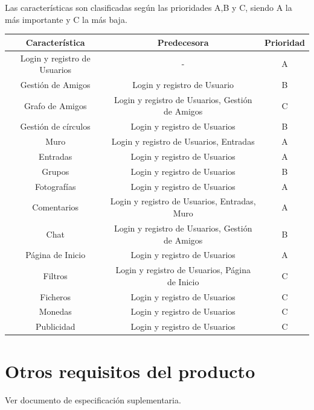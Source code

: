 \documentclass[12pt, a4paper, titlepage]{article}
\begin{document}
Las características son clasificadas según las prioridades A,B y C, siendo A la más importante y C la más baja.

\begin{center}

\begin{tabular}{|c|c|c|}
\hline 
Característica & Predecesora & Prioridad \\ 
\hline 
Login y registro de Usuarios & - & A \\ 
\hline 
Gestión de Amigos & Login y registro de Usuario & B \\ 
\hline 
Grafo de Amigos & Login y registro de Usuarios, Gestión de Amigos & C \\ 
\hline 
Gestión de círculos & Login y registro de Usuarios & B\\ 
\hline 
Muro & Login y registro de Usuarios, Entradas & A \\ 
\hline 
Entradas & Login y registro de Usuarios & A \\ 
\hline 
Grupos & Login y registro de Usuarios & B \\ 
\hline 
Fotografías & Login y registro de Usuarios & A \\ 
\hline 
Comentarios & Login y registro de Usuarios, Entradas, Muro & A \\ 
\hline 
Chat & Login y registro de Usuarios, Gestión de Amigos & B \\ 
\hline 
Página de Inicio & Login y registro de Usuarios & A \\ 
\hline 
Filtros & Login y registro de Usuarios, Página de Inicio & C \\ 
\hline 
Ficheros & Login y registro de Usuarios & C \\ 
\hline 
Monedas & Login y registro de Usuarios & C \\ 
\hline 
Publicidad & Login y registro de Usuarios & C \\ 
\hline 
\end{tabular} 

\end{center}

\section{Otros requisitos del producto}

Ver documento de especificación suplementaria.
\end{document}
